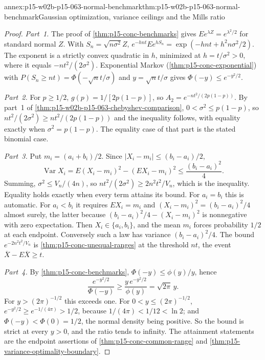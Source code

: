 \begin{annexitem}{annex:p15-w02b-p15-063-normal-benchmark}{thm:p15-w02b-p15-063-normal-benchmark}{Gaussian optimization, variance ceilings and the Mills ratio}
\begin{proof}
\emph{Part~1.} The proof of \cref{thm:p15-conc-benchmarks} gives
\(Ee^{\lambda Z}=e^{\lambda^2/2}\) for standard normal \(Z\). With
\(S_n=\sqrt{n\sigma^2}Z\), \(e^{-hnt}Ee^{hS_n}=\exp(-hnt+h^2n\sigma^2/2)\).
The exponent is a strictly convex quadratic in \(h\), minimized at
\(h=t/\sigma^2>0\), where it equals \(-nt^2/(2\sigma^2)\). Exponential
Markov (\cref{thm:p15-conc-exponential}) with
\(P(S_n\geq nt)=\Phi(-\sqrt nt/\sigma)\) and \(y=\sqrt nt/\sigma\) gives
\(\Phi(-y)\leq e^{-y^2/2}\).

\emph{Part~2.} For \(p\geq1/2\), \(g(p)=1/[2p(1-p)]\), so
\(A_2=e^{-nt^2/(2p(1-p))}\). By part~1 of
\cref{thm:p15-w02b-p15-063-chebyshev-comparison},
\(0<\sigma^2\leq p(1-p)\), so \(nt^2/(2\sigma^2)\geq nt^2/(2p(1-p))\) and
the inequality follows, with equality exactly when \(\sigma^2=p(1-p)\).
The equality case of that part is the stated binomial case.

\emph{Part~3.} Put \(m_i=(a_i+b_i)/2\). Since \(|X_i-m_i|\leq(b_i-a_i)/2\),
\[
 \operatorname{Var}X_i=E(X_i-m_i)^2-(EX_i-m_i)^2\leq\frac{(b_i-a_i)^2}4 .
\]
Summing, \(\sigma^2\leq V_n/(4n)\), so
\(nt^2/(2\sigma^2)\geq 2n^2t^2/V_n\), which is the inequality.
Equality holds exactly when every term attains its bound. For \(a_i=b_i\)
this is automatic. For \(a_i<b_i\) it requires \(EX_i=m_i\) and
\((X_i-m_i)^2=(b_i-a_i)^2/4\) almost surely, the latter because
\((b_i-a_i)^2/4-(X_i-m_i)^2\) is nonnegative with zero expectation. Then
\(X_i\in\{a_i,b_i\}\), and the mean \(m_i\) forces probability \(1/2\) at
each endpoint. Conversely such a law has variance \((b_i-a_i)^2/4\).
The bound \(e^{-2n^2t^2/V_n}\) is \cref{thm:p15-conc-unequal-ranges} at the
threshold \(nt\), the event \(\overline X-E\overline X\geq t\).

\emph{Part~4.} By \cref{thm:p15-conc-benchmarks},
\(\Phi(-y)\leq\phi(y)/y\), hence
\[
 \frac{e^{-y^2/2}}{\Phi(-y)}\geq\frac{y\,e^{-y^2/2}}{\phi(y)}=\sqrt{2\pi}\,y .
\]
For \(y>(2\pi)^{-1/2}\) this exceeds one. For
\(0<y\leq(2\pi)^{-1/2}\), \(e^{-y^2/2}\geq e^{-1/(4\pi)}>1/2\), because
\(1/(4\pi)<1/12<\ln2\); and \(\Phi(-y)<\Phi(0)=1/2\), the normal density
being positive. So the bound is strict at every \(y>0\), and the ratio
tends to infinity. The attainment statements are the endpoint assertions
of \cref{thm:p15-conc-common-range} and
\cref{thm:p15-variance-optimality-boundary}.


\end{proof}
\end{annexitem}
